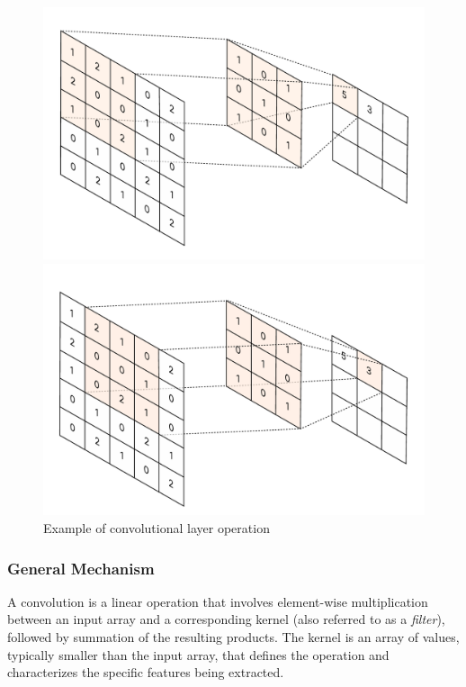 \documentclass{pracalicmgr}
\begin{document}
\begin{figure}[H]
    \centering
    \begin{minipage}[t]{0.48\textwidth}
        \centering
        \includegraphics[width=\textwidth]{src/conv1.pdf}
    \end{minipage}
    \hfill
    \begin{minipage}[t]{0.48\textwidth}
        \centering
        \includegraphics[width=\textwidth]{src/conv2.pdf}
    \end{minipage}
    \caption{Example of convolutional layer operation}
    \label{fig:conv_layer}
\end{figure}

\subsubsection{General Mechanism}

A convolution is a linear operation that involves element-wise multiplication between an input array and a corresponding kernel (also referred to as a \textit{filter}), followed by summation of the resulting products. The kernel is an array of values, typically smaller than the input array, that defines the operation and characterizes the specific features being extracted.
\end{document}
